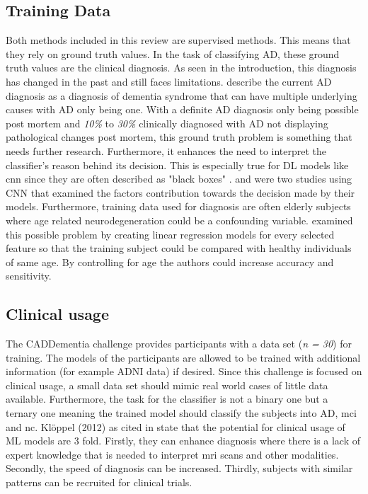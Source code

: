 \subsection{Training Data}
Both methods included in this review are supervised methods. This means that they rely on ground truth values. In the task of classifying \gls{AD}, these ground truth values are the clinical diagnosis. As seen in the introduction, this diagnosis has changed in the past and still faces limitations. \textcite{jackNIAAAResearchFramework2018} describe the current \gls{AD} diagnosis as a diagnosis of dementia syndrome that can have multiple underlying causes with \gls{AD} only being one. With a definite \gls{AD} diagnosis only being possible post mortem and \textit{10\%} to \textit{30\%} clinically diagnosed with AD not displaying pathological changes post mortem, this ground truth problem is something that needs further research. Furthermore, it enhances the need to interpret the classifier's reason behind its decision. This is especially true for \gls{DL} models like \gls{cnn} since they are often described as "black boxes" \autocite{syaifullahMachineLearningDiagnosis2021}. \textcite{yeeConstructionMRIBasedAlzheimer2021} and \textcite{liuMultimodelDeepConvolutional2020a} were two studies using CNN that examined the factors contribution towards the decision made by their models. 
Furthermore, training data used for diagnosis are often elderly subjects where age related neurodegeneration could be a confounding variable. \textcite{liPredictionClinicalBiomarker2020} examined this possible problem by creating linear regression models for every selected feature so that the training subject could be compared with healthy individuals of same age. By controlling for age the authors could increase accuracy and sensitivity.   




\subsection{Clinical usage}
The CADDementia challenge provides participants with a data set (\textit{n = 30}) for training. The models of the participants are allowed to be trained with additional information (for example ADNI data) if desired. Since this challenge is focused on clinical usage, a small data set should mimic real world cases of little data available. Furthermore, the task for the classifier is not a binary one but a ternary one meaning the trained model should classify the subjects into \gls{AD}, \gls{mci} and \gls{nc}. Klöppel (2012) as cited in \textcite{bron} state that the potential for clinical usage of \gls{ML} models are 3 fold. Firstly, they can enhance diagnosis where there is a lack of expert knowledge that is needed to interpret \gls{mri} scans and other modalities. Secondly, the speed of diagnosis can be increased. Thirdly, subjects with similar patterns can be recruited for clinical trials.

